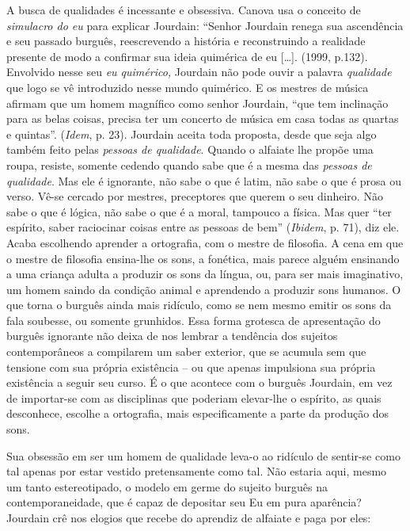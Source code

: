 A busca de qualidades é incessante e obsessiva. Canova usa o conceito de
\emph{simulacro do eu} para explicar Jourdain: ``Senhor Jourdain renega
sua ascendência e seu passado burguês, reescrevendo a história e
reconstruindo a realidade presente de modo a confirmar sua ideia
quimérica de eu {[}\ldots{}{]}. (1999, p.132). Envolvido nesse seu
\emph{eu quimérico,} Jourdain não pode ouvir a palavra \emph{qualidade}
que logo se vê introduzido nesse mundo quimérico. E os mestres de música
afirmam que um homem magnífico como senhor Jourdain, ``que tem
inclinação para as belas coisas, precisa ter um concerto de música em
casa todas as quartas e quintas''. (\emph{Idem}, p. 23). Jourdain aceita
toda proposta, desde que seja algo também feito pelas \emph{pessoas de
qualidade}. Quando o alfaiate lhe propõe uma roupa, resiste, somente
cedendo quando sabe que é a mesma das \emph{pessoas de qualidade}. Mas
ele é ignorante, não sabe o que é latim, não sabe o que é prosa ou
verso. Vê-se cercado por mestres, preceptores que querem o seu dinheiro.
Não sabe o que é lógica, não sabe o que é a moral, tampouco a física.
Mas quer ``ter espírito, saber raciocinar coisas entre as pessoas de
bem'' (\emph{Ibidem}, p. 71), diz ele. Acaba escolhendo aprender a
ortografia, com o mestre de filosofia. A cena em que o mestre de
filosofia ensina-lhe os sons, a fonética, mais parece alguém ensinando a
uma criança adulta a produzir os sons da língua, ou, para ser mais
imaginativo, um homem saindo da condição animal e aprendendo a produzir
sons humanos. O que torna o burguês ainda mais ridículo, como se nem
mesmo emitir os sons da fala soubesse, ou somente grunhidos. Essa forma
grotesca de apresentação do burguês ignorante não deixa de nos lembrar a
tendência dos sujeitos contemporâneos a compilarem um saber exterior,
que se acumula sem que tensione com sua própria existência -- ou que
apenas impulsiona sua própria existência a seguir seu curso. É o que
acontece com o burguês Jourdain, em vez de importar-se com as
disciplinas que poderiam elevar-lhe o espírito, as quais desconhece,
escolhe a ortografia, mais especificamente a parte da produção dos sons.

Sua obsessão em ser um homem de qualidade leva-o ao ridículo de
sentir-se como tal apenas por estar vestido pretensamente como tal. Não
estaria aqui, mesmo um tanto estereotipado, o modelo em germe do sujeito
burguês na contemporaneidade, que é capaz de depositar seu Eu em pura
aparência? Jourdain crê nos elogios que recebe do aprendiz de alfaiate e
paga por eles:

